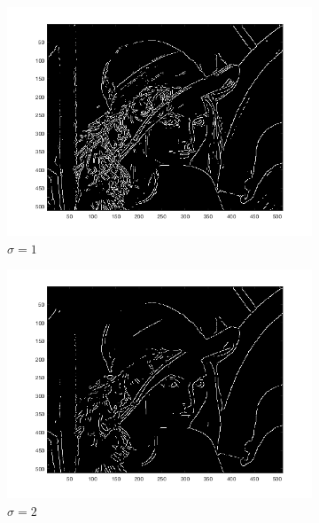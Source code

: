 \documentclass[a4paper]{article}
\begin{document}
\begin{figure}[H]
    \centering
    \begin{subfigure}[c]{0.3\textwidth}
        \centering
        \includegraphics[width=\textwidth]{images/lena_nms_gauss1.png}
        \caption{$\sigma=1$}
    \end{subfigure}
    \begin{subfigure}[c]{0.3\textwidth}
        \centering
        \includegraphics[width=\textwidth]{images/lena_nms_gauss2.png}
        \caption{$\sigma=2$}
    \end{subfigure}
    \begin{subfigure}[c]{0.3\textwidth}
        \centering

\end{subfigure}
\end{figure}
\end{document}
